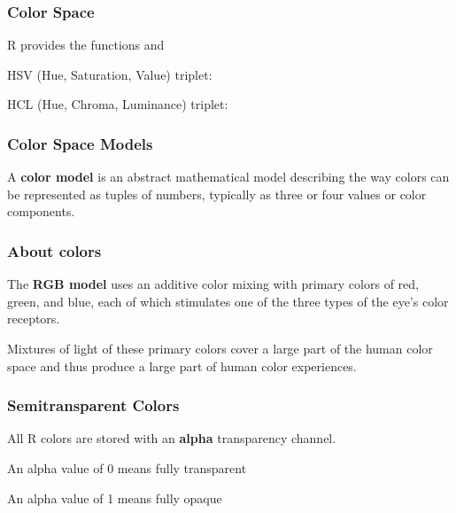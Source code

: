 \documentclass[12pt]{beamer}\usepackage[]{graphicx}\usepackage[]{color}
\begin{document}

\begin{frame}
\frametitle{Color Space}

R provides the functions  and 
 \bi
  \item {\hilit HSV} (Hue, Saturation, Value) triplet: \\ 
  \item {\hilit HCL} (Hue, Chroma, Luminance) triplet: \\ 
 \ei
\eb

\end{frame}


\begin{frame}
\frametitle{Color Space Models}

A \textbf{color model} is an abstract mathematical model describing the way colors can be represented as tuples of numbers, typically as three or four values or color components.
\eb

\end{frame}


\begin{frame}
\frametitle{About colors}

The \textbf{RGB model} uses an additive color mixing with primary colors of red, green, and blue, each of which stimulates one of the three types of the eye's color receptors.
\eb

Mixtures of light of these primary colors cover a large part of the human color space and thus produce a large part of human color experiences.
\eb

\end{frame}


\begin{frame}
\begin{center}
\Huge{}
\end{center}
\end{frame}


\begin{frame}
\frametitle{Semitransparent Colors}

All R colors are stored with an \textbf{alpha} transparency channel.
\bi
 \item An alpha value of 0 means fully transparent
 \item An alpha value of 1 means fully opaque
\ei
\eb

\end{frame}
\end{document}
